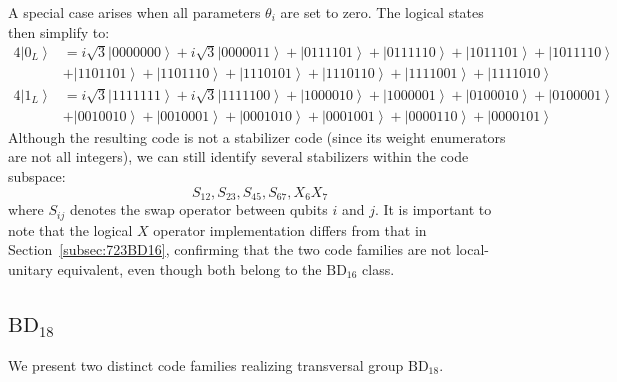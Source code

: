\documentclass[8pt]{article}
\theoremstyle{definition}
\begin{document}
A special case arises when all parameters \(\theta_i\) are set to zero. The logical states then simplify to:
\begin{align*}
    4\left|0_{L}\right\rangle & =i\sqrt{3}\left|0000000\right\rangle +i\sqrt{3}\left|0000011\right\rangle +\left|0111101\right\rangle +\left|0111110\right\rangle +\left|1011101\right\rangle +\left|1011110\right\rangle \\
                              & +\left|1101101\right\rangle +\left|1101110\right\rangle +\left|1110101\right\rangle +\left|1110110\right\rangle +\left|1111001\right\rangle +\left|1111010\right\rangle                   \\
    4\left|1_{L}\right\rangle & =i\sqrt{3}\left|1111111\right\rangle +i\sqrt{3}\left|1111100\right\rangle +\left|1000010\right\rangle +\left|1000001\right\rangle +\left|0100010\right\rangle +\left|0100001\right\rangle \\
                              & +\left|0010010\right\rangle +\left|0010001\right\rangle +\left|0001010\right\rangle +\left|0001001\right\rangle +\left|0000110\right\rangle +\left|0000101\right\rangle
\end{align*}
Although the resulting code is not a stabilizer code (since its weight enumerators are not all integers), we can still identify several stabilizers within the code subspace:
\[ S_{12},S_{23},S_{45},S_{67},X_{6}X_{7} \]
where \(S_{ij}\) denotes the swap operator between qubits \(i\) and \(j\). It is important to note that the logical \(X\) operator implementation differs from that in Section~\ref{subsec:723BD16}, confirming that the two code families are not local-unitary equivalent, even though both belong to the \(\mathrm{BD}_{16}\) class.

\subsection{\texorpdfstring{$\mathrm{BD}_{18}$}{BD₁₈}}

We present two distinct code families realizing transversal group \(\mathrm{BD}_{18}\).
\end{document}
